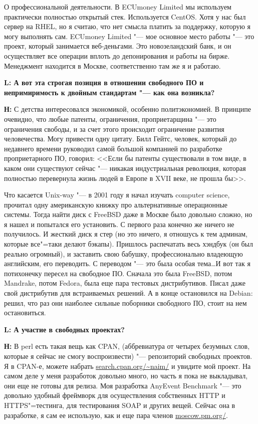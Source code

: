 \documentclass[10pt, a5paper]{article}
\begin{document}
О профессиональной деятельности. В ECUmoney Limited мы используем практически полностью открытый стек. Используется CentOS. Хотя у нас был сервер на RHEL, но я считаю, что нет смысла платить за поддержку, которую я могу выполнять сам. ECUmoney Limited "--- мое основное место работы "--- это проект, который занимается веб-деньгами. Это новозеландский банк, и он осуществляет все операции вплоть до депонирования и работы на бирже. Менеджмент находится в Москве, соответственно там же я и работаю. 

{\noindent \bf L: А вот эта строгая позиция в отношении свободного ПО и непримиримость к двойным стандартам "--- как она возникла?}

{\noindent \bf Н:} С детства интересовался экономикой, особенно политэкономией. В принципе очевидно, что любые патенты, ограничения, проприетарщина "--- это ограничения свободы, и за счет этого происходит ограничение развития человечества. Могу привести одну цитату. Билл Гейтс, человек, который до недавнего времени руководил самой большой компанией по разработке проприетарного ПО, говорил: <<Если бы патенты существовали в том виде, в каком они существуют сейчас "--- никакая индустриальная революция, которая полностью перевернула жизнь людей в Европе в XVII веке, не прошла бы>>.

Что касается Unix-way "--- в 2001 году я начал изучать computer science, прочитал одну американскую книжку про альтернативные операционные системы. Тогда найти диск с FreeBSD даже в Москве было довольно сложно, но я нашел и попытался его установить. С первого раза конечно же ничего не получилось.  И жесткий диск я стер (но это ничего, я отношусь к тем админам, которые все"=таки делают бэкапы). Пришлось распечатать весь хэндбук (он был реально огромный), и заставить свою бабушку, профессионально владеющую английским, его переводить. С переводом "--- это была особая тема\ldots  И вот так я потихонечку пересел на свободное ПО. Сначала это была FreeBSD, потом Mandrake, потом Fedora, была еще пара тестовых дистрибутивов. Писал даже свой дистрибутив для встраиваемых решений. А в конце остановился на Debian: решил, что раз они наиболее сильные поборники свободного ПО, стоит на нем остановиться.

{\noindent \bf L: А участие в свободных проектах?}

{\noindent \bf Н:} В perl есть такая вещь как CPAN, (аббревиатура от четырех безумных слов, которые я сейчас не смогу воспроизвести) "--- репозиторий свободных проектов. Я в CPAN-е, можете набрать \url{search.cpan.org/~naim/} и увидите мой проект. На самом деле у меня разработок довольно много, но часть я пока не выкладывал, они еще не готовы для релиза. Моя разработка AnyEvent Benchmark "--- это довольно удобный фреймворк для осуществления собственных HTTP и HTTPS"=тестинга, для тестирования SOAP и других вещей. Сейчас она в разработке, я сам ее использую, как и еще пара членов \url{moscow.pm.org/}.
\end{document}
